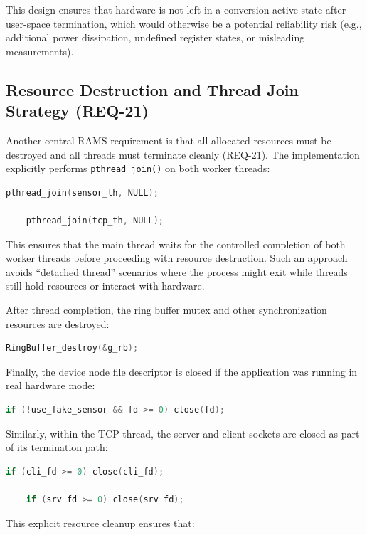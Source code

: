 This design ensures that hardware is not left in a conversion-active state after user-space termination, which would otherwise be a potential reliability risk (e.g., additional power dissipation, undefined register states, or misleading measurements).

\subsection{Resource Destruction and Thread Join Strategy (REQ-21)}

Another central RAMS requirement is that all allocated resources must be destroyed and all threads must terminate cleanly (REQ-21). The implementation explicitly performs \texttt{pthread\_join()} on both worker threads:

\begin{lstlisting}[language=C]
	pthread_join(sensor_th, NULL);
	
	pthread_join(tcp_th, NULL);
\end{lstlisting}

This ensures that the main thread waits for the controlled completion of both worker threads before proceeding with resource destruction. Such an approach avoids “detached thread” scenarios where the process might exit while threads still hold resources or interact with hardware.

After thread completion, the ring buffer mutex and other synchronization resources are destroyed:

\begin{lstlisting}[language=C]
	RingBuffer_destroy(&g_rb);
\end{lstlisting}

Finally, the device node file descriptor is closed if the application was running in real hardware mode:

\begin{lstlisting}[language=C]
	if (!use_fake_sensor && fd >= 0) close(fd);
\end{lstlisting}

Similarly, within the TCP thread, the server and client sockets are closed as part of its termination path:

\begin{lstlisting}[language=C]
	if (cli_fd >= 0) close(cli_fd);
	
	if (srv_fd >= 0) close(srv_fd);
\end{lstlisting}

This explicit resource cleanup ensures that:

